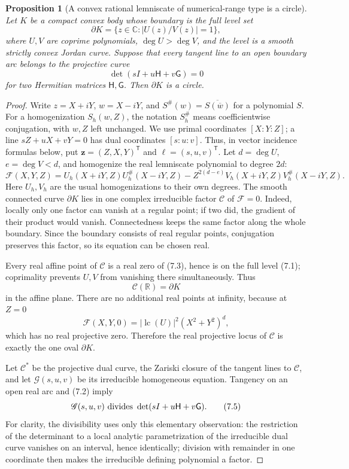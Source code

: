 \documentclass[11pt]{article}
\newtheorem{proposition}[theorem]{Proposition}
\theoremstyle{definition}
\theoremstyle{remark}
\newcommand{\C}{\mathbb C}
\begin{document}
\begin{proposition}[A convex rational lemniscate of numerical-range type is a circle]
\label{prop:circle}
Let \(K\) be a compact convex body whose boundary is the full level set
\[
 \partial K=\{z\in\C:|U(z)/V(z)|=1\},                 \tag{7.1}
\]
where \(U,V\) are coprime polynomials, \(\deg U>\deg V\), and the level is a
smooth strictly convex Jordan curve.  Suppose that every tangent line to an
open boundary arc belongs to the projective curve
\[
 \det(sI+u\mathsf H+v\mathsf G)=0                    \tag{7.2}
\]
for two Hermitian matrices \(\mathsf H,\mathsf G\).  Then \(\partial K\) is a
circle.
\end{proposition}

\begin{proof}
Write \(z=X+iY\), \(w=X-iY\), and
\(S^\#(w)=\overline{S(\overline w)}\) for a polynomial \(S\).
For a homogenization \(S_h(w,Z)\), the notation \(S_h^\#\) means
coefficientwise conjugation, with \(w,Z\) left unchanged.
We use primal coordinates \([X:Y:Z]\); a line
\(sZ+uX+vY=0\) has dual coordinates \([s:u:v]\).  Thus, in vector
incidence formulas below, put
\(\mathbf z=(Z,X,Y)^{\mathsf T}\) and
\(\boldsymbol\ell=(s,u,v)^{\mathsf T}\).
Let \(d=\deg U\), \(e=\deg V<d\), and homogenize the real lemniscate polynomial
to degree \(2d\):
\[
 \mathscr F(X,Y,Z)=
 U_h(X+iY,Z)U_h^\#(X-iY,Z)
 -Z^{2(d-e)}V_h(X+iY,Z)V_h^\#(X-iY,Z).               \tag{7.3}
\]
Here \(U_h,V_h\) are the usual homogenizations to their own degrees.
The smooth connected curve \(\partial K\) lies in one complex irreducible
factor \(\mathscr C\) of \(\mathscr F=0\).  Indeed, locally only one factor can
vanish at a regular point; if two did, the gradient of their product would
vanish.  Connectedness keeps the same factor along the whole boundary.  Since
the boundary consists of real regular points, conjugation preserves this
factor, so its equation can be chosen real.

Every real affine point of \(\mathscr C\) is a real zero of (7.3), hence is on
the full level (7.1); coprimality prevents \(U,V\) from vanishing there
simultaneously.  Thus
\[
 \mathscr C(\mathbb R)=\partial K
\]
in the affine plane.  There are no additional real points at infinity,
because at \(Z=0\)
\[
 \mathscr F(X,Y,0)=|\operatorname{lc}(U)|^2
                    (X^2+Y^2)^d,                    \tag{7.4}
\]
which has no real projective zero.  Therefore the real projective locus of
\(\mathscr C\) is exactly the one oval \(\partial K\).

Let \(\mathscr C^*\) be the projective dual curve, the Zariski closure of the
tangent lines to \(\mathscr C\), and let
\(\mathscr G(s,u,v)\) be its irreducible homogeneous equation.  Tangency on an
open real arc and (7.2) imply
\[
 \mathscr G(s,u,v)\ \hbox{divides}\ 
 \det(sI+u\mathsf H+v\mathsf G).                     \tag{7.5}
\]
For clarity, the divisibility uses only this elementary observation: the
restriction of the determinant to a local analytic parametrization of the
irreducible dual curve vanishes on an interval, hence identically; division
with remainder in one coordinate then makes the irreducible defining
polynomial a factor.


\end{proof}
\end{document}
